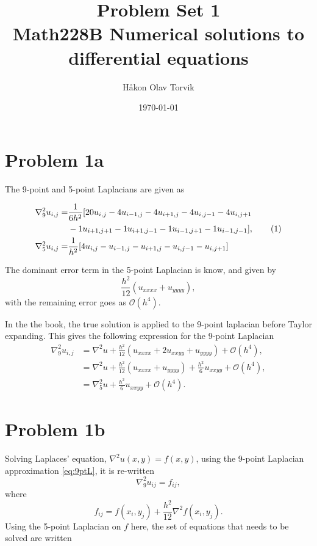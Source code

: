 \documentclass[aps, 12pt]{revtex4}
\newcommand\numberthis{\addtocounter{equation}{1}\tag{\theequation}}
\begin{document}
\author{Håkon Olav Torvik}
\title{\Huge Problem Set 1 \\ \small Math228B Numerical solutions to differential equations}
\date{\today}


\maketitle

\section*{Problem 1a}
The 9-point and 5-point Laplacians are given as

\begin{align*}\label{eq:9ptL}
    \nabla_9^2u_{i,j} = & \frac{1}{6h^2 }[20u_{i,j} -  4u_{i-1,j} -   4u_{i+1,j} -  4u_{i,j-1} - 4u_{i,j+1}
    \\
                        & - 1u_{i+1,j+1} - 1u_{i+1,j-1} - 1u_{i-1,j+1} - 1u_{i-1,j-1}], \numberthis{}
    \\
    \nabla_5^2u_{i,j} = & \frac{1}{h^2}[4u_{i,j} - u_{i-1,j} - u_{i+1,j} - u_{i,j-1} - u_{i,j+1}]
\end{align*}

The dominant error term in the 5-point Laplacian is know, and given by
\begin{equation*}
    \frac{h^2}{12}(u_{xxxx} +u_{yyyy}),
\end{equation*}
with the remaining error goes as $\mathcal{O}(h^4)$.

In the the book, the true solution is applied to the 9-point laplacian before Taylor expanding. This gives the following expression for the 9-point Laplacian
\begin{align*}
    \nabla_9^2u_{i, j} & = \nabla^2 u + \frac{h^2}{12}\left(u_{xxxx} + 2u_{xxyy} + u_{yyyy}\right) + \mathcal{O}(h^4),
    \\
                       & =\nabla^2u +\frac{h^2}{12}(u_{xxxx} + u_{yyyy}) + \frac{h^2}{6}u_{xxyy} + \mathcal{O}(h^4),
    \\
                       & = \nabla_5^2u + \frac{h^2}{6}u_{xxyy} +\mathcal{O}(h^4).
\end{align*}

\section*{Problem 1b}
Solving Laplaces' equation, $\nabla^2u(x,y)=f(x,y)$, using the 9-point Laplacian approximation \eqref{eq:9ptL}, it is re-written
\begin{equation*}
    \nabla_9^2u_{ij} = f_{ij},
\end{equation*}
where
\begin{equation*}
    f_{ij} = f(x_i, y_j) + \frac{h^2}{12} \nabla^2f(x_i, y_j).
\end{equation*}
Using the 5-point Laplacian on $f$ here, the set of equations that needs to be solved are written
\end{document}
